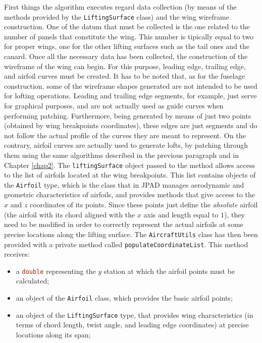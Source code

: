 First things the algorithm executes regard data collection (by means of the methods provided by the \lstinline[language=Java]!LiftingSurface! class) and the wing wireframe construction. One of the datum that must be collected is the one related to the number of panels that constitute the wing. This number is tipically equal to two for proper wings, one for the other lifting surfaces such as the tail ones and the canard. Once all the necessary data has been collected, the construction of the wireframe of the wing can begin. For this purpose, leading edge, trailing edge, and airfoil curves must be created. It has to be noted that, as for the fuselage construction, some of the wireframe shapes generated are not intended to be used for lofting operations. Leading and trailing edge segments, for example, just serve for graphical purposes, and are not actually used as guide curves when performing patching. Furthermore, being generated by means of just two points (obtained by wing breakpoints coordinates), these edges are just segments and do not follow the actual profile of the curves they are meant to represent. On the contrary, airfoil curves are actually used to generate lofts, by patching through them using the same algorithms described in the previous paragraph and in Chapter \ref{chap2}. The \lstinline[language=Java]!liftingSurface! object passed to the method allows access to the list of airfoils located at the wing breakpoints. This list contains objects of the \lstinline[language=Java]!Airfoil! type, which is the class that in \gls{JPAD} manages aerodynamic and geometric characteristics of airfoils, and provides methods that give access to the $x$ and $z$ coordinates of its points. Since these points just define the \emph{absolute} airfoil (the airfoil with its chord aligned with the $x$ axis and length equal to $1$), they need to be modified in order to correctly represent the actual airfoils at some precise locations along the lifting surface. The \lstinline[language=Java]!AircraftUtils! class has then been provided with a private method called \lstinline[language=Java]!populateCoordinateList!. This method receives:
%
\begin{itemize}
\item a \lstinline[language=Java]!double! representing the $y$ station at which the airfoil points must be calculated;
\item an object of the \lstinline[language=Java]!Airfoil! class, which provides the basic airfoil points;
\item an object of the \lstinline[language=Java]!LiftingSurface! type, that provides wing characteristics (in terms of chord length, twist angle, and leading edge coordinates) at precise locations along its span;
\end{itemize}
